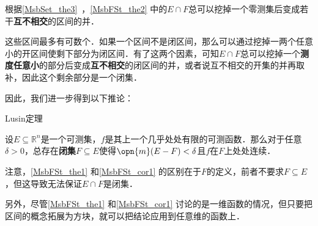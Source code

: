 根据\autoref{MsbSet_the3}~，\autoref{MsbFSt_the2} 中的$E\cap F$总可以挖掉一个零测集后变成若干\textbf{互不相交}的区间的并．

这些区间最多有可数个．如果一个区间不是闭区间，那么可以通过挖掉一两个任意小的开区间使剩下部分为闭区间．有了这两个因素，可知$E\cap F$总可以挖掉一个\textbf{测度任意小}的部分后变成\textbf{互不相交}的闭区间的并，或者说互不相交的开集的并再取补，因此这个剩余部分是一个闭集．

因此，我们进一步得到以下推论：

\begin{corollary}{Lusin定理}\label{MsbFSt_cor1}

设$E\subseteq\mathbb{R}^n$是一个可测集，$f$是其上一个几乎处处有限的可测函数．那么对于任意$\delta>0$，总存在\textbf{闭集}$F\subseteq E$使得$\opn{m}(E-F)<\delta$且$f$在$F$上处处连续．

\end{corollary}

注意，\autoref{MsbFSt_the1} 和\autoref{MsbFSt_cor1} 的区别在于$F$的定义，前者不要求$F\subseteq E$，但这导致无法保证$E\cap F$是闭集．

另外，尽管\autoref{MsbFSt_the1} 和\autoref{MsbFSt_cor1} 讨论的是一维函数的情况，但只要把区间的概念拓展为方块，就可以把结论应用到任意维的函数上．
















